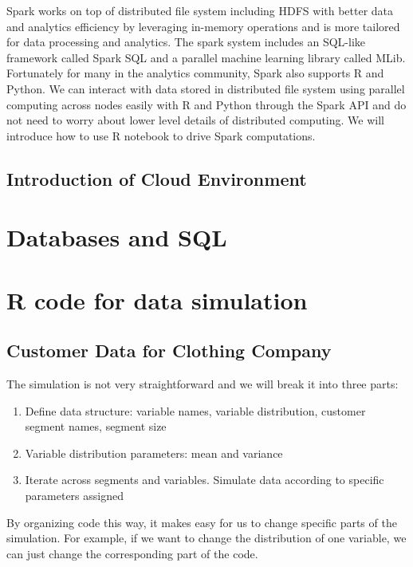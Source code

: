 \documentclass[12pt,]{krantz}
\providecommand{\tightlist}{%
  \setlength{\itemsep}{0pt}\setlength{\parskip}{0pt}}
\theoremstyle{definition}
\theoremstyle{definition}
\theoremstyle{definition}
\theoremstyle{remark}
\begin{document}
Spark works on top of distributed file system including HDFS with better
data and analytics efficiency by leveraging in-memory operations and is
more tailored for data processing and analytics. The spark system
includes an SQL-like framework called Spark SQL and a parallel machine
learning library called MLib. Fortunately for many in the analytics
community, Spark also supports R and Python. We can interact with data
stored in distributed file system using parallel computing across nodes
easily with R and Python through the Spark API and do not need to worry
about lower level details of distributed computing. We will introduce
how to use R notebook to drive Spark computations.

\section{Introduction of Cloud
Environment}\label{introduction-of-cloud-environment}

\chapter{Databases and SQL}\label{databases-and-sql}

\chapter{R code for data simulation}\label{r-code-for-data-simulation}

\section{Customer Data for Clothing
Company}\label{customer-data-for-clothing-company-1}

The simulation is not very straightforward and we will break it into
three parts:

\begin{enumerate}
\def\labelenumi{\arabic{enumi}.}
\tightlist
\item
  Define data structure: variable names, variable distribution, customer
  segment names, segment size
\item
  Variable distribution parameters: mean and variance
\item
  Iterate across segments and variables. Simulate data according to
  specific parameters assigned
\end{enumerate}

By organizing code this way, it makes easy for us to change specific
parts of the simulation. For example, if we want to change the
distribution of one variable, we can just change the corresponding part
of the code.
\end{document}
